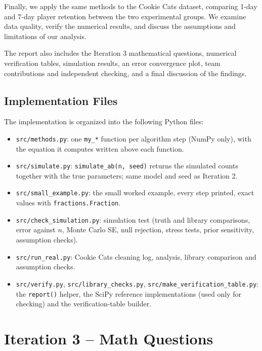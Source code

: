 \documentclass[11pt]{article}
\begin{document}
Finally, we apply the same methods to the Cookie Cats
dataset, comparing 1-day and 7-day player retention
between the two experimental groups. We examine data
quality, verify the numerical results, and discuss
the assumptions and limitations of our analysis.

The report also includes the Iteration 3 mathematical
questions, numerical verification tables, simulation
results, an error convergence plot, team contributions
and independent checking, and a final discussion of
the findings.

\subsection{Implementation Files}

The implementation is organized into the following
Python files:

\begin{itemize}
    \item \texttt{src/methods.py}: one \texttt{my\_*} function per algorithm step (NumPy only), with the equation it computes written above each function.
    \item \texttt{src/simulate.py}: \texttt{simulate\_ab(n, seed)} returns the simulated counts together with the true parameters; same model and seed as Iteration 2.
    \item \texttt{src/small\_example.py}: the small worked example, every step printed, exact values with \texttt{fractions.Fraction}.
    \item \texttt{src/check\_simulation.py}: simulation test (truth and library comparisons, error against $n$, Monte Carlo SE, null rejection, stress tests, prior sensitivity, assumption checks).
    \item \texttt{src/run\_real.py}: Cookie Cats cleaning log, analysis, library comparison and assumption checks.
    \item \texttt{src/verify.py}, \texttt{src/library\_checks.py}, \texttt{src/make\_verification\_table.py}: the \texttt{report()} helper, the SciPy reference implementations (used only for checking) and the verification-table builder.
\end{itemize}


\section{Iteration 3 -- Math Questions}
\end{document}
